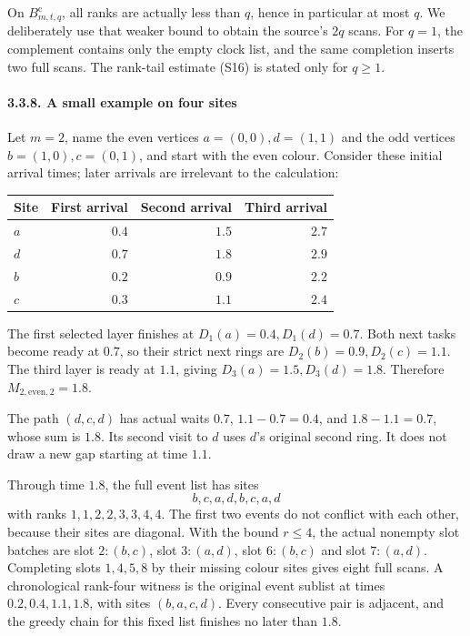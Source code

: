 \documentclass[
  11pt,
  a4paper,
]{article}
\begin{document}
On \(B_{m,t,q}^{\mathrm c}\), all ranks are actually less than \(q\),
hence in particular at most \(q\). We deliberately use that weaker bound
to obtain the source's \(2q\) scans. For \(q=1\), the complement
contains only the empty clock list, and the same completion inserts two
full scans. The rank-tail estimate (S16) is stated only for \(q\geq1\).

\paragraph{3.3.8. A small example on four
sites}\label{a-small-example-on-four-sites}

Let \(m=2\), name the even vertices \(a=(0,0),d=(1,1)\) and the odd
vertices \(b=(1,0),c=(0,1)\), and start with the even colour. Consider
these initial arrival times; later arrivals are irrelevant to the
calculation:

\begin{longtable}[]{@{}lrrr@{}}
\toprule\noalign{}
Site & First arrival & Second arrival & Third arrival \\
\midrule\noalign{}
\endhead
\bottomrule\noalign{}
\endlastfoot
\(a\) & \(0.4\) & \(1.5\) & \(2.7\) \\
\(d\) & \(0.7\) & \(1.8\) & \(2.9\) \\
\(b\) & \(0.2\) & \(0.9\) & \(2.2\) \\
\(c\) & \(0.3\) & \(1.1\) & \(2.4\) \\
\end{longtable}

The first selected layer finishes at \(D_1(a)=0.4,D_1(d)=0.7\). Both
next tasks become ready at \(0.7\), so their strict next rings are
\(D_2(b)=0.9,D_2(c)=1.1\). The third layer is ready at \(1.1\), giving
\(D_3(a)=1.5,D_3(d)=1.8\). Therefore \(M_{2,\mathrm{even},2}=1.8\).

The path \((d,c,d)\) has actual waits \(0.7\), \(1.1-0.7=0.4\), and
\(1.8-1.1=0.7\), whose sum is \(1.8\). Its second visit to \(d\) uses
\(d\)'s original second ring. It does not draw a new gap starting at
time \(1.1\).

Through time \(1.8\), the full event list has sites \[
b,c,a,d,b,c,a,d
\] with ranks \(1,1,2,2,3,3,4,4\). The first two events do not conflict
with each other, because their sites are diagonal. With the bound
\(r\leq4\), the actual nonempty slot batches are slot \(2:(b,c)\), slot
\(3:(a,d)\), slot \(6:(b,c)\) and slot \(7:(a,d)\). Completing slots
\(1,4,5,8\) by their missing colour sites gives eight full scans. A
chronological rank-four witness is the original event sublist at times
\(0.2,0.4,1.1,1.8\), with sites \((b,a,c,d)\). Every consecutive pair is
adjacent, and the greedy chain for this fixed list finishes no later
than \(1.8\).
\end{document}
